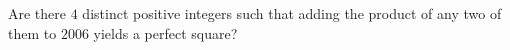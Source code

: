 Are there $4$ distinct positive integers such that adding the product of any two of them to $2006$ yields a perfect square?